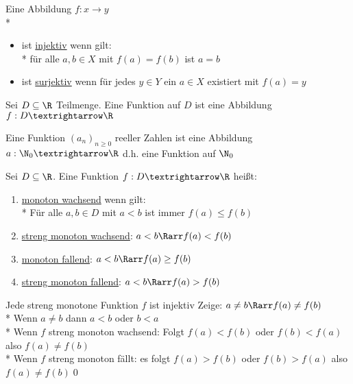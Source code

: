 \wdh
Eine Abbildung $f:x→y$\\*
\begin{itemize}
\item{ist \ul{injektiv} wenn gilt:\\*
für alle $a,b\in X$ mit $f(a)=f(b)$ ist $a=b$}
\item{ist \ul{surjektiv} wenn für jedes $y\in Y$ ein $a\in X$ existiert mit $f(a)=y$}
\end{itemize}
Sei $D\subseteq\R$ Teilmenge. Eine Funktion auf $D$ ist eine Abbildung $f:D→\R$

\bem
Eine Funktion $(a_n)_{n\geq 0}$ reeller Zahlen ist eine Abbildung $a:\N_0→\R$ d.h. eine Funktion auf $\N_0$

Sei $D\subseteq\R$. Eine Funktion  $f:D→\R$ heißt:
\begin{enumerate}
\item{\ul{monoton wachsend} wenn gilt:\\*
Für alle $a,b\in D$ mit $a<b$ ist immer $f(a)\leq f(b)$}
\item{\ul{streng monoton wachsend}: $a<b\Rarr f(a)<f(b)$}
\item{\ul{monoton fallend}: $a<b\Rarr f(a)\geq f(b)$}
\item{\ul{streng monoton fallend}: $a<b\Rarr f(a)> f(b)$}
\end{enumerate}
%
\bem
Jede streng monotone Funktion $f$ ist injektiv
%
\bew
Zeige: $a\neq b\Rarr f(a)\neq f(b)$\\*
Wenn $a\neq b$ dann $a< b$ oder $b<a$\\*
Wenn $f$ streng monoton wachsend: Folgt $f(a)< f(b)$ oder $f(b)< f(a)$ also $f(a)\neq f(b)$\\*
Wenn $f$ streng monoton fällt: es folgt $f(a)> f(b)$ oder $f(b)> f(a)$ also $f(a)\neq f(b)$\qed

